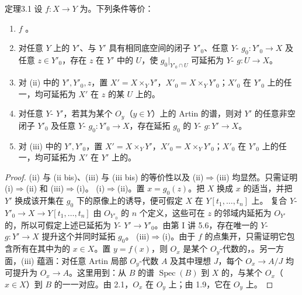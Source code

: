 \begin{SGAresult}{定理}{3.1}
设 $f:X\to Y$ 为。下列条件等价：
\begin{enumerate}
\item[(i)] $f$ 。
\item[(ii)] 对任意 $Y$ 上的 $Y'$、与 $Y'$ 具有相同底空间的闭子 $Y'_0$、任意 $Y$- $g_0:Y'_0\to X$ 及任意 $z\in Y'_0$，存在 $z$ 在 $Y'$ 中的 $U$，使 $g_0|_{Y'_0\cap U}$ 可延拓为 $Y$- $g:U\to X$。
\item[(ii bis)] 对 (ii) 中的 $Y',Y'_0,z$，置 $X'=X\times_Y Y'$，$X'_0=X\times_Y Y'_0$；$X'_0$ 在 $Y'_0$ 上的任一，均可延拓为 $X'$ 在 $z$ 的某 $U$ 上的。
\item[(iii)] 对任意 $Y$- $Y'$，若其为某个 $O_y$（$y\in Y$）上的 Artin 的谱，则对 $Y'$ 的任意非空闭子 $Y'_0$ 及任意 $Y$- $g_0:Y'_0\to X$，存在延拓 $g_0$ 的 $Y$- $g:Y'\to X$。
\item[(iii bis)] 对 (iii) 中的 $Y',Y'_0$，置 $X'=X\times_Y Y'$，$X'_0=X\times_Y Y'_0$；$X'_0$ 在 $Y'_0$ 上的任一，均可延拓为 $X'$ 在 $Y'$ 上的。
\end{enumerate}
\end{SGAresult}
\begin{proof}
(ii) 与 (ii bis)、(iii) 与 (iii bis) 的等价性以及 (ii)$\Rightarrow$(iii) 均显然。只需证明 (i)$\Rightarrow$(ii) 和 (iii)$\Rightarrow$(i)。
(i)$\Rightarrow$(ii)。置 $x=g_0(z)$。把 $X$ 换成 $x$ 的适当，并把 $Y'$ 换成该开集在 $g_0$ 下的原像上的诱导，便可假定 $X$ 在 $Y[t_1,\ldots,t_n]$ 上。
复合 $Y$- $Y'_0\to X\to Y[t_1,\ldots,t_n]$ 由 $O_{Y'_0}$ 的 $n$ 个定义，这些可在 $z$ 的邻域内延拓为 $O_{Y'}$ 的，所以可假定上述已延拓为 $Y$- $Y'\to Y'_0$。由第 I 讲 5.6，存在唯一的 $Y$- $g:Y'\to X$ 提升这个并同时延拓 $g_0$。
(iii)$\Rightarrow$(i)。由于 $f$ 的点集开，只需证明它包含所有在其中为的 $x\in X$。置 $y=f(x)$，则 $O_x$ 是某个 $O_y$-代数的，。另一方面，(iii) 蕴涵：对任意 Artin 局部 $O_y$-代数 $A$ 及其中理想 $J$，每个 $O_x\to A/J$ 均可提升为 $O_x\to A$。这里用到：从 $B$ 的谱 $\operatorname{Spec}(B)$ 到 $X$ 的，与某个 $O_x$（$x\in X$）到 $B$ 的一一对应。由 2.1，$O_x$ 在 $O_y$ 上；由 1.9，它在 $O_y$ 上。
\end{proof}
